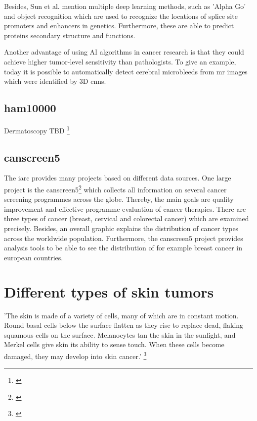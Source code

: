Besides, Sun et al. mention multiple deep learning methods, such as 'Alpha Go' and object recognition which are used to recognize the locations of splice site promoters and enhancers in genetics. Furthermore, these are able to predict proteins secondary structure and functions.

Another advantage of using AI algorithms in cancer research is that they could achieve higher tumor-level sensitivity than pathologists. To give an example, today it is possible to automatically detect cerebral microbleeds from \ac{mr} images which were identified by 3D \ac{cnn}s.

\subsection{\ac{ham10000}}
Dermatoscopy TBD 
\footnote{\cite{ham10000}}

\subsection{\ac{canscreen5}}

The \ac{iarc} provides many projects based on different data sources. One large project is the \ac{canscreen5}\footnote{\cite{iarc_canscreen5_project}} which collects all information on several cancer screening programmes across the globe. Thereby, the main goals are quality improvement and effective programme evaluation of cancer therapies. There are three types of cancer (breast, cervical and colorectal cancer) which are examined precisely. Besides, an overall graphic explains the distribution of cancer types across the worldwide population. Furthermore, the \ac{canscreen5} project provides analysis tools to be able to see the distribution of for example breast cancer in european countries.  

\section{Different types of skin tumors}

'The skin is made of a variety of cells, many of which are in constant motion. Round basal cells below the surface flatten as they rise to replace dead, flaking squamous cells on the surface. Melanocytes tan the skin in the sunlight, and Merkel cells give skin its ability to sense touch. When these cells become damaged, they may develop into skin cancer.' \footnote{\cite{skin_cancer_types}} 

